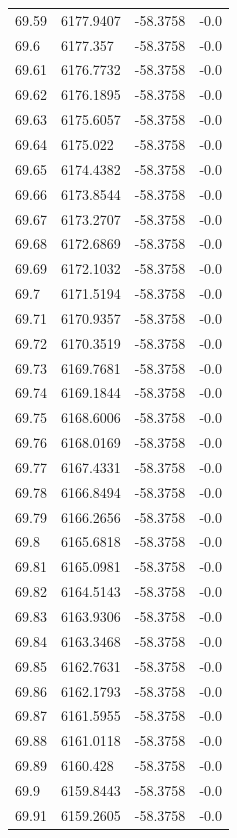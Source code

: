 \begin{table}[H]
\begin{tabular}{llll}
69.59 & 6177.9407 & -58.3758 & -0.0 \\
69.6 & 6177.357 & -58.3758 & -0.0 \\
69.61 & 6176.7732 & -58.3758 & -0.0 \\
69.62 & 6176.1895 & -58.3758 & -0.0 \\
69.63 & 6175.6057 & -58.3758 & -0.0 \\
69.64 & 6175.022 & -58.3758 & -0.0 \\
69.65 & 6174.4382 & -58.3758 & -0.0 \\
69.66 & 6173.8544 & -58.3758 & -0.0 \\
69.67 & 6173.2707 & -58.3758 & -0.0 \\
69.68 & 6172.6869 & -58.3758 & -0.0 \\
69.69 & 6172.1032 & -58.3758 & -0.0 \\
69.7 & 6171.5194 & -58.3758 & -0.0 \\
69.71 & 6170.9357 & -58.3758 & -0.0 \\
69.72 & 6170.3519 & -58.3758 & -0.0 \\
69.73 & 6169.7681 & -58.3758 & -0.0 \\
69.74 & 6169.1844 & -58.3758 & -0.0 \\
69.75 & 6168.6006 & -58.3758 & -0.0 \\
69.76 & 6168.0169 & -58.3758 & -0.0 \\
69.77 & 6167.4331 & -58.3758 & -0.0 \\
69.78 & 6166.8494 & -58.3758 & -0.0 \\
69.79 & 6166.2656 & -58.3758 & -0.0 \\
69.8 & 6165.6818 & -58.3758 & -0.0 \\
69.81 & 6165.0981 & -58.3758 & -0.0 \\
69.82 & 6164.5143 & -58.3758 & -0.0 \\
69.83 & 6163.9306 & -58.3758 & -0.0 \\
69.84 & 6163.3468 & -58.3758 & -0.0 \\
69.85 & 6162.7631 & -58.3758 & -0.0 \\
69.86 & 6162.1793 & -58.3758 & -0.0 \\
69.87 & 6161.5955 & -58.3758 & -0.0 \\
69.88 & 6161.0118 & -58.3758 & -0.0 \\
69.89 & 6160.428 & -58.3758 & -0.0 \\
69.9 & 6159.8443 & -58.3758 & -0.0 \\
69.91 & 6159.2605 & -58.3758 & -0.0 \\

\end{tabular}
\end{table}
